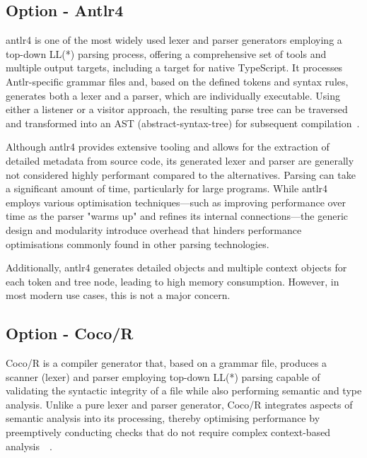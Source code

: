 \subsection{Option - Antlr4}
\label{sec:parser-technology-option-antlr4}

\Gls{antlr4} is one of the most widely used lexer and parser generators employing a top-down LL(*) parsing process, offering a comprehensive set of tools and multiple output targets, including a target for native TypeScript. It processes Antlr-specific grammar files and, based on the defined tokens and syntax rules, generates both a lexer and a parser, which are individually executable. Using either a listener or a visitor approach, the resulting parse tree can be traversed and transformed into an AST (\Gls{abstract-syntax-tree}) for subsequent compilation~\cite{antlr}.

Although \Gls{antlr4} provides extensive tooling and allows for the extraction of detailed metadata from source code, its generated lexer and parser are generally not considered highly performant compared to the alternatives. Parsing can take a significant amount of time, particularly for large programs. While \Gls{antlr4} employs various optimisation techniques—such as improving performance over time as the parser "warms up" and refines its internal connections—the generic design and modularity introduce overhead that hinders performance optimisations commonly found in other parsing technologies.

Additionally, \Gls{antlr4} generates detailed objects and multiple context objects for each token and tree node, leading to high memory consumption. However, in most modern use cases, this is not a major concern.

\subsection{Option - Coco/R}
\label{sec:parser-technology-option-coco}

Coco/R is a compiler generator that, based on a grammar file, produces a scanner (lexer) and parser employing top-down LL(*) parsing capable of validating the syntactic integrity of a file while also performing semantic and type analysis. Unlike a pure lexer and parser generator, Coco/R integrates aspects of semantic analysis into its processing, thereby optimising performance by preemptively conducting checks that do not require complex context-based analysis~\cite{coco}~\cite{coco-manual}.

